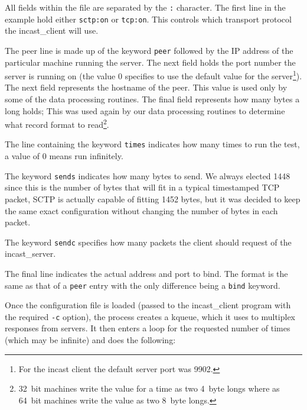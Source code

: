 \documentclass[12pt]{article}
\begin{document}
All fields within the file are separated by the \texttt{:} character.
The first line in the example hold either \texttt{sctp:on} or \texttt{tcp:on}. This controls which transport protocol
the incast\_client will use. 

The peer line is made up of the keyword \texttt{peer} followed by the IP address of the particular
machine running the server. The next field holds the port  number the server is
running on (the value 0 specifies to use the default value for the server\footnote{For the incast
client the default server port was 9902.}). The next field represents the hostname of the peer. This value 
is used only by some of the data processing routines. The final field represents how many bytes a
long holds; This was used again by our data processing routines to determine what record format
to read\footnote{32~bit machines write the value for a time as two 4~byte longs where as 64~bit machines
write the value as two 8~byte longs.}.

The line containing the keyword \texttt{times} indicates how many times to run the test, a value of 0
means run infinitely.

The keyword \texttt{sends} indicates how many bytes to send. We always elected 1448 since this is
the number of bytes that will fit in a typical timestamped TCP packet, SCTP is actually capable
of fitting 1452 bytes, but it was decided to keep the same exact configuration without changing
the number of bytes in each packet.

The keyword \texttt{sendc} specifies how many packets the client should request of the incast\_server.

The final line indicates the actual address and port to bind. The format is the same as that
of a \texttt{peer} entry with the only difference being a \texttt{bind} keyword.

Once the configuration file is loaded (passed to the incast\_client program with the required
\texttt{-c} option), the process creates a kqueue, which it uses to multiplex responses from
servers. It then enters a loop for the requested number of times (which may be infinite) and
does the following:

\end{document}
